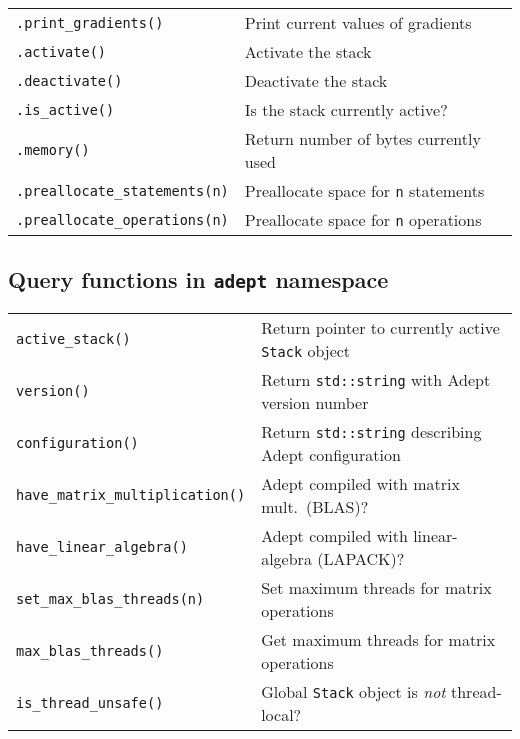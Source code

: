 \documentclass[10pt,a4,landscape]{article}
\def\code#1{\texttt{#1}}
\begin{document}
\begin{tabular}{ll}
\code{.print\_gradients()} & Print current values of gradients\\
\code{.activate()} & Activate the stack \\
\code{.deactivate()} & Deactivate the stack\\
\code{.is\_active()} & Is the stack currently active?\\
\code{.memory()} & Return number of bytes currently used\\
\code{.preallocate\_statements(n)} & Preallocate space for \code{n} statements\\
\code{.preallocate\_operations(n)} & Preallocate space for \code{n} operations\\
\end{tabular}

\subsection*{Query functions in \code{adept} namespace}
\begin{tabular}{ll}
\code{active\_stack()} & Return pointer to currently active \code{Stack} object\\
\code{version()} & Return \code{std::string} with Adept version number\\
\code{configuration()} & Return \code{std::string} describing Adept configuration\\
\code{have\_matrix\_multiplication()} & Adept compiled with matrix mult.\ (BLAS)?\\
\code{have\_linear\_algebra()} & Adept compiled with linear-algebra (LAPACK)?\\
\code{set\_max\_blas\_threads(n)} & Set maximum threads for matrix operations\\
\code{max\_blas\_threads()} & Get maximum threads for matrix operations\\
\code{is\_thread\_unsafe()} & Global \code{Stack} object is \textit{not} thread-local?\\
\end{tabular}
\newpage
\end{document}

